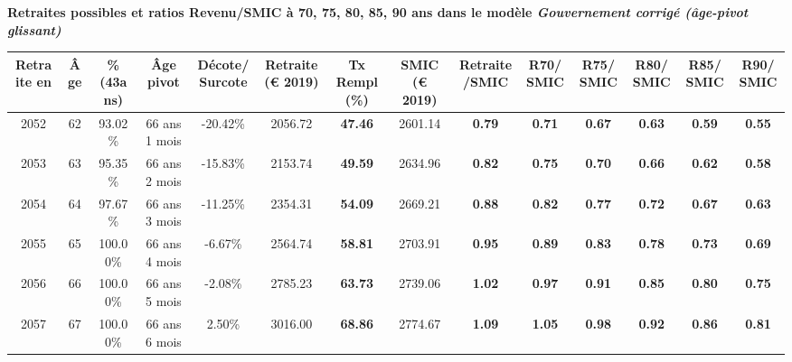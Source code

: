  \vspace{0.1cm} 
{\bf \noindent Retraites possibles et ratios Revenu/SMIC à 70, 75, 80, 85, 90 ans dans le modèle \emph{Gouvernement corrigé (âge-pivot glissant)}}  
 
\begin{adjustbox}{max width=\textwidth} 
\begin{tabular}[htb]{|c|c||c|c|c||c|c||c|c||c|c|c|c|c|} 
\hline 
 Retraite en &  Âge &  \%(43ans) &  Âge pivot &  Décote/Surcote &  Retraite (\euro{} 2019) &  Tx Rempl(\%) &  SMIC (\euro{} 2019) &  Retraite/SMIC &  R70/SMIC &  R75/SMIC &  R80/SMIC &  R85/SMIC &  R90/SMIC \\ 
\hline \hline 
 2052 &  62 &  93.02\% &  66 ans 1 mois &  -20.42\% &  2056.72 &  {\bf 47.46} &  2601.14 &  {\bf {\color{red} 0.79}} &  {\bf {\color{red} 0.71}} &  {\bf {\color{red} 0.67}} &  {\bf {\color{red} 0.63}} &  {\bf {\color{red} 0.59}} &  {\bf {\color{red} 0.55}} \\ 
\hline 
 2053 &  63 &  95.35\% &  66 ans 2 mois &  -15.83\% &  2153.74 &  {\bf 49.59} &  2634.96 &  {\bf {\color{red} 0.82}} &  {\bf {\color{red} 0.75}} &  {\bf {\color{red} 0.70}} &  {\bf {\color{red} 0.66}} &  {\bf {\color{red} 0.62}} &  {\bf {\color{red} 0.58}} \\ 
\hline 
 2054 &  64 &  97.67\% &  66 ans 3 mois &  -11.25\% &  2354.31 &  {\bf 54.09} &  2669.21 &  {\bf {\color{red} 0.88}} &  {\bf {\color{red} 0.82}} &  {\bf {\color{red} 0.77}} &  {\bf {\color{red} 0.72}} &  {\bf {\color{red} 0.67}} &  {\bf {\color{red} 0.63}} \\ 
\hline 
 2055 &  65 &  100.00\% &  66 ans 4 mois &  -6.67\% &  2564.74 &  {\bf 58.81} &  2703.91 &  {\bf {\color{red} 0.95}} &  {\bf {\color{red} 0.89}} &  {\bf {\color{red} 0.83}} &  {\bf {\color{red} 0.78}} &  {\bf {\color{red} 0.73}} &  {\bf {\color{red} 0.69}} \\ 
\hline 
 2056 &  66 &  100.00\% &  66 ans 5 mois &  -2.08\% &  2785.23 &  {\bf 63.73} &  2739.06 &  {\bf 1.02} &  {\bf {\color{red} 0.97}} &  {\bf {\color{red} 0.91}} &  {\bf {\color{red} 0.85}} &  {\bf {\color{red} 0.80}} &  {\bf {\color{red} 0.75}} \\ 
\hline 
 2057 &  67 &  100.00\% &  66 ans 6 mois &  2.50\% &  3016.00 &  {\bf 68.86} &  2774.67 &  {\bf 1.09} &  {\bf 1.05} &  {\bf {\color{red} 0.98}} &  {\bf {\color{red} 0.92}} &  {\bf {\color{red} 0.86}} &  {\bf {\color{red} 0.81}} \\ 
\hline 
\hline 
\end{tabular} 
\end{adjustbox} 
 
